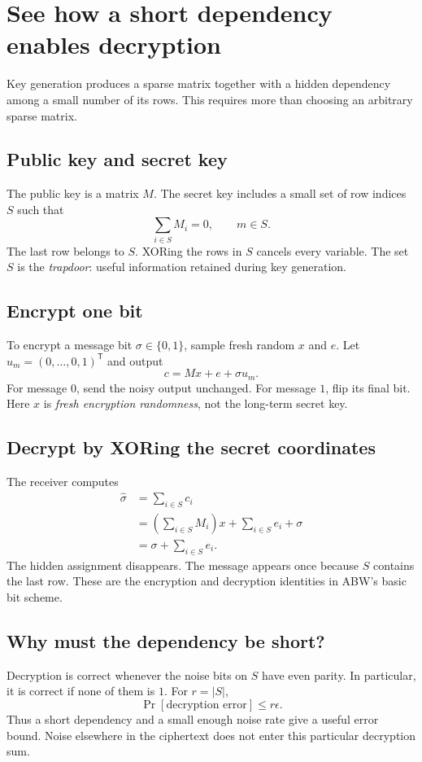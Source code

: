 \documentclass[11pt,a4paper]{article}
\begin{document}
\section{See how a short dependency enables decryption}
Key generation produces a sparse matrix together with a hidden dependency among a small number of its rows. This requires more than choosing an arbitrary sparse matrix.~\cite{draft2}

\subsection*{Public key and secret key}
The public key is a matrix $M$. The secret key includes a small set of row indices $S$ such that
\[
\sum_{i\in S}M_i=0,\qquad m\in S.
\]
The last row belongs to $S$. XORing the rows in $S$ cancels every variable. The set $S$ is the \emph{trapdoor}: useful information retained during key generation.

\subsection*{Encrypt one bit}
To encrypt a message bit $\sigma\in\{0,1\}$, sample fresh random $x$ and $e$. Let $u_m=(0,\ldots,0,1)^{\mathsf T}$ and output
\[
\boxed{c=Mx+e+\sigma u_m.}
\]
For message $0$, send the noisy output unchanged. For message $1$, flip its final bit. Here $x$ is \emph{fresh encryption randomness}, not the long-term secret key.~\cite{draft2}

\subsection*{Decrypt by XORing the secret coordinates}
The receiver computes
\begin{align*}
\widehat\sigma
&=\sum_{i\in S}c_i\\
&=\left(\sum_{i\in S}M_i\right)x+\sum_{i\in S}e_i+\sigma\\
&=\boxed{\sigma+\sum_{i\in S}e_i}.
\end{align*}
The hidden assignment disappears. The message appears once because $S$ contains the last row. These are the encryption and decryption identities in ABW's basic bit scheme.~\cite{abw}

\subsection*{Why must the dependency be short?}
Decryption is correct whenever the noise bits on $S$ have even parity. In particular, it is correct if none of them is $1$. For $r=|S|$,
\[
\Pr[\text{decryption error}]\leq r\epsilon.
\]
Thus a short dependency and a small enough noise rate give a useful error bound. Noise elsewhere in the ciphertext does not enter this particular decryption sum.
\end{document}
